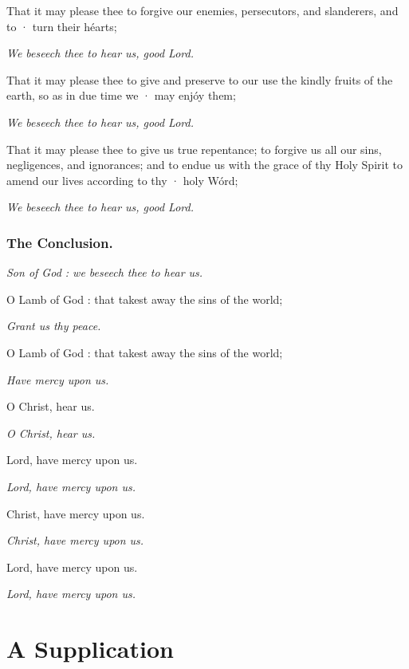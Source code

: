 That it may please thee to forgive our enemies, persecutors, and slanderers, and to · turn their héarts;

\centerline{\emph{We beseech thee to hear us, good Lord.}}

That it may please thee to give and preserve to our use the kindly fruits of the earth, so as in due time we · may enjóy them;

\centerline{\emph{We beseech thee to hear us, good Lord.}}

That it may please thee to give us true repentance; to forgive us all our sins, negligences, and ignorances; and to endue us with the grace of thy Holy Spirit to amend our lives according to thy · holy Wórd;

\centerline{\emph{We beseech thee to hear us, good Lord.}}


\subsubsection{The Conclusion.}


\centerline{\emph{Son of God : we beseech thee to hear us.}}

O Lamb of God : that takest away the sins of the world;

\centerline{\emph{Grant us thy peace.}}

O Lamb of God : that takest away the sins of the world;

\centerline{\emph{Have mercy upon us.}}

\centerline{O Christ, hear us.}
\centerline{\emph{O Christ, hear us.}}

\centerline{Lord, have mercy upon us.}
\centerline{\emph{Lord, have mercy upon us.}}
\centerline{Christ, have mercy upon us.}
\centerline{\emph{Christ, have mercy upon us.}}
\centerline{Lord, have mercy upon us.}
\centerline{\emph{Lord, have mercy upon us.}}


\medskip


\noindent
{}
\ourFather

\medskip



\section{A Supplication}

